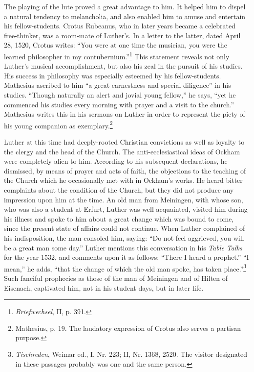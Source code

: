 The playing of the lute proved a great advantage to him. It helped
him to dispel a natural tendency to melancholia, and also enabled
him to amuse and entertain his fellow-students. Crotus Rubeanus,
who in later years became a celebrated free-thinker, was a room-mate
of Luther’s. In a letter to the latter, dated April 28, 1520, Crotus
writes: “You were at one time the musician, you were the learned
philosopher in my contubernium.”\footnote{\textit{Briefwechsel}, II, p. 391.}
This statement reveals not only
Luther’s musical accomplishment, but also his zeal in the pursuit
of his studies. His success in philosophy was especially esteemed by
his fellow-students. Mathesius ascribed to him “a great earnestness
and special diligence” in his studies. “Though naturally an alert and
jovial young fellow,” he says, “yet he commenced his studies every
morning with prayer and a visit to the church.” Mathesius writes
this in his sermons on Luther in order to represent the piety of his
young companion as exemplary.\footnote{Mathesius, p. 19. The laudatory expression of Crotus also serves a partisan purpose.}

Luther at this time had deeply-rooted Christian convictions as
well as loyalty to the clergy and the head of the Church. The anti-ecclesiastical
ideas of Ockham were completely alien to him. According
to his subsequent declarations, he dismissed, by means of
prayer and acts of faith, the objections to the teaching of the Church
which he occasionally met with in Ockham’s works. He heard bitter
complaints about the condition of the Church, but they did not
produce any impression upon him at the time. An old man from
Meiningen, with whose son, who was also a student at Erfurt, Luther
was well acquainted, visited him during his illness and spoke to him
about a great change which was bound to come, since the present
state of affairs could not continue. When Luther complained of his
indisposition, the man consoled him, saying: “Do not feel aggrieved,
you will be a great man some day.” Luther mentions this conversation
in his \textit{Table Talks} for the year 1532, and comments upon it as follows: “There I heard a prophet.” “I mean,” he adds, “that
the change of which the old man spoke, has taken place.”\footnote{
    \textit{Tischreden}, Weimar ed., I, Nr. 223; II, Nr. 1368, 2520.
    The visitor designated in these passages probably was one and the same person.}
Such fanciful prophecies as those of the man of Meiningen and of Hilten
of Eisenach, captivated him, not in his student days, but in later life.

